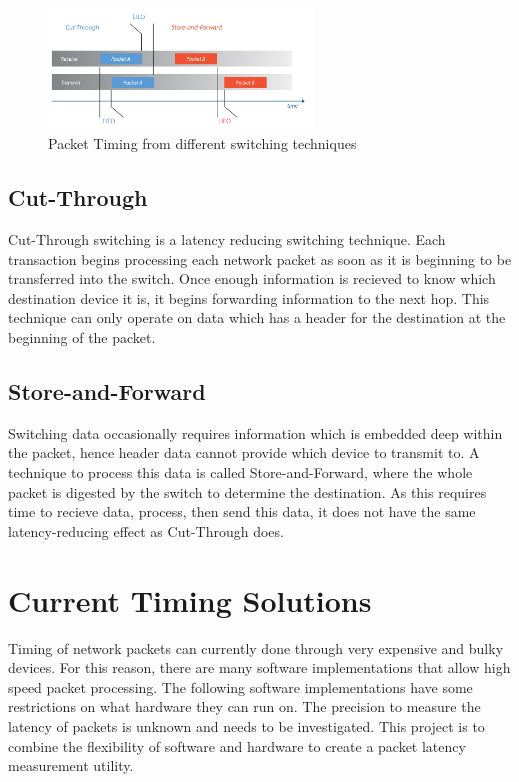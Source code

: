 \begin{figure}[H]
    \begin{center}
        \includegraphics[width=7cm,keepaspectratio]{Images/SwitchingTechniques.png}
        \caption{Packet Timing from different switching techniques \cite{latencyinethernet}}
        \label{fig:PacketTiming}
    \end{center}
\end{figure}

\subsection{Cut-Through}

\par Cut-Through switching is a latency reducing switching technique. 
Each transaction begins processing each network packet as soon as it is beginning to be transferred into the switch.
Once enough information is recieved to know which destination device it is, it begins forwarding information to the next hop.
This technique can only operate on data which has a header for the destination at the beginning of the packet.

\subsection{Store-and-Forward}

\par Switching data occasionally requires information which is embedded deep within the packet, hence header data cannot provide which device to transmit to.
A technique to process this data is called Store-and-Forward, where the whole packet is digested by the switch to determine the destination.
As this requires time to recieve data, process, then send this data, it does not have the same latency-reducing effect as Cut-Through does.

\section{Current Timing Solutions}

\par Timing of network packets can currently done through very expensive and bulky devices. 
For this reason, there are many software implementations that allow high speed packet processing.
The following software implementations have some restrictions on what hardware they can run on.
The precision to measure the latency of packets is unknown and needs to be investigated.
This project is to combine the flexibility of software and hardware to create a packet latency measurement utility.


